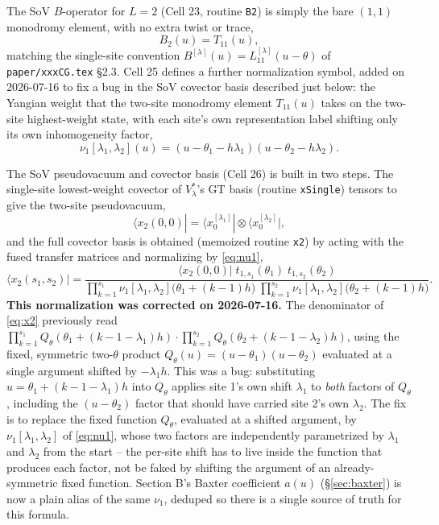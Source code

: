 \documentclass[11pt]{article}
\newcommand{\qth}{Q_\theta}
\begin{document}
The SoV $B$-operator for $L=2$ (Cell 23, routine \texttt{B2}) is simply the bare $(1,1)$ monodromy
element, with no extra twist or trace,
\[
  B_2(u) = T_{11}(u),
\]
matching the single-site convention $B^{[\lambda]}(u)=L^{[\lambda]}_{11}(u-\theta)$ of
\texttt{paper/xxxCG.tex} \S2.3. Cell 25 defines a further normalization symbol, added on 2026-07-16
to fix a bug in the SoV covector basis described just below: the Yangian weight that the two-site
monodromy element $T_{11}(u)$ takes on the two-site highest-weight state, with each site's own
representation label shifting only its own inhomogeneity factor,
\begin{equation}
  \nu_1[\lambda_1,\lambda_2](u) = (u-\theta_1-h\lambda_1)(u-\theta_2-h\lambda_2).
  \label{eq:nu1}
\end{equation}

The SoV pseudovacuum and covector basis (Cell 26) is built in two steps. The single-site
lowest-weight covector of $V_\lambda^*$'s GT basis (routine \texttt{xSingle}) tensors to give the
two-site pseudovacuum,
\[
  \langle x_2(0,0)| = \langle x^{[\lambda_1]}_0|\otimes\langle x^{[\lambda_2]}_0|,
\]
and the full covector basis is obtained (memoized routine \texttt{x2}) by acting with the fused
transfer matrices and normalizing by \eqref{eq:nu1},
\begin{equation}
  \langle x_2(s_1,s_2)| =
  \frac{\langle x_2(0,0)|\;t_{1,s_1}(\theta_1)\;t_{1,s_2}(\theta_2)}
       {\displaystyle\prod_{k=1}^{s_1}\nu_1[\lambda_1,\lambda_2]\bigl(\theta_1+(k-1)h\bigr)\;
        \prod_{k=1}^{s_2}\nu_1[\lambda_1,\lambda_2]\bigl(\theta_2+(k-1)h\bigr)}.
  \label{eq:x2}
\end{equation}
\textbf{This normalization was corrected on 2026-07-16.} The denominator of \eqref{eq:x2}
previously read $\prod_{k=1}^{s_1}\qth(\theta_1+(k-1-\lambda_1)h)\cdot
\prod_{k=1}^{s_2}\qth(\theta_2+(k-1-\lambda_2)h)$, using the fixed, symmetric two-$\theta$ product
$\qth(u)=(u-\theta_1)(u-\theta_2)$ evaluated at a single argument shifted by $-\lambda_1 h$. This
was a bug: substituting $u=\theta_1+(k-1-\lambda_1)h$ into $\qth$ applies site 1's own shift
$\lambda_1$ to \emph{both} factors of $\qth$, including the $(u-\theta_2)$ factor that should have
carried site 2's own $\lambda_2$. The fix is to replace the fixed function $\qth$, evaluated at a
shifted argument, by $\nu_1[\lambda_1,\lambda_2]$ of \eqref{eq:nu1}, whose two factors are
independently parametrized by $\lambda_1$ and $\lambda_2$ from the start -- the per-site shift has
to live inside the function that produces each factor, not be faked by shifting the argument of an
already-symmetric fixed function. Section B's Baxter coefficient $a(u)$ (\S\ref{sec:baxter}) is now
a plain alias of the same $\nu_1$, deduped so there is a single source of truth for this formula.
\end{document}
